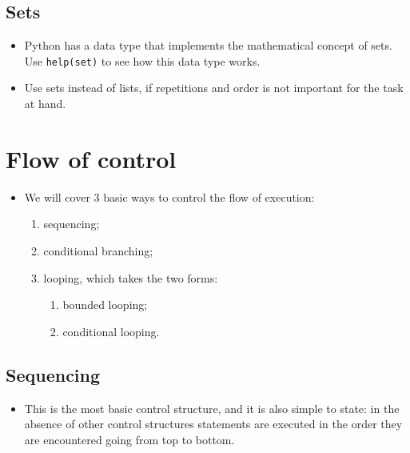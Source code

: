\documentclass[a4paper]{article}
\begin{document}
\subsection{Sets}
\begin{itemize}

\item Python has a  data type that
implements the mathematical concept of sets. Use \Verb+help(set)+ to see how
this data type works.

\item Use sets instead of lists, if repetitions and order is not important for
the task at hand.

\end{itemize}

\section{Flow of control}

\begin{itemize}

\item We will cover 3 basic ways to control the flow of execution:
	\begin{enumerate}
	\item sequencing;
	\item conditional branching;
	\item looping, which takes the two forms:
		\begin{enumerate}
		\item bounded looping;
		\item conditional looping.
		\end{enumerate}
	\end{enumerate}

\end{itemize}

\subsection{Sequencing}

\begin{itemize}

\item This is the most basic control structure, and it is also simple to state:
in the absence of other control structures statements are executed in the order
they are encountered going from top to bottom.

\end{itemize}
\end{document}
